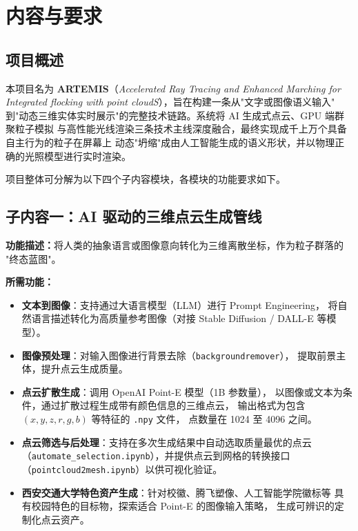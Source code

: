 
\section{内容与要求}

\subsection{项目概述}

本项目名为 \textbf{ARTEMIS}（\textit{Accelerated Ray Tracing and Enhanced Marching
for Integrated flocking with point cloudS}），旨在构建一条从"文字或图像语义输入"
到"动态三维实体实时展示"的完整技术链路。系统将 AI 生成式点云、GPU 端群聚粒子模拟
与高性能光线渲染三条技术主线深度融合，最终实现成千上万个具备自主行为的粒子在屏幕上
动态"坍缩"成由人工智能生成的语义形状，并以物理正确的光照模型进行实时渲染。

项目整体可分解为以下四个子内容模块，各模块的功能要求如下。

\subsection{子内容一：AI 驱动的三维点云生成管线}

\textbf{功能描述：}将人类的抽象语言或图像意向转化为三维离散坐标，作为粒子群落的
"终态蓝图"。

\textbf{所需功能：}
\begin{itemize}
  \item \textbf{文本到图像}：支持通过大语言模型（LLM）进行 Prompt Engineering，
        将自然语言描述转化为高质量参考图像（对接 Stable Diffusion / DALL-E 等模型）。
  \item \textbf{图像预处理}：对输入图像进行背景去除（\texttt{backgroundremover}），
        提取前景主体，提升点云生成质量。
  \item \textbf{点云扩散生成}：调用 OpenAI Point-E 模型（1B 参数量），
        以图像或文本为条件，通过扩散过程生成带有颜色信息的三维点云，
        输出格式为包含 $(x, y, z, r, g, b)$ 等特征的 \texttt{.npy} 文件，
        点数量在 1024 至 4096 之间。
  \item \textbf{点云筛选与后处理}：支持在多次生成结果中自动选取质量最优的点云
        （\texttt{automate\_selection.ipynb}），并提供点云到网格的转换接口
        （\texttt{pointcloud2mesh.ipynb}）以供可视化验证。
  \item \textbf{西安交通大学特色资产生成}：针对校徽、腾飞塑像、人工智能学院徽标等
        具有校园特色的目标物，探索适合 Point-E 的图像输入策略，
        生成可辨识的定制化点云资产。
\end{itemize}

